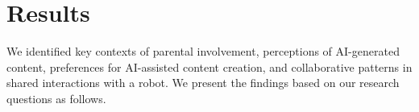 \section{Results}
We identified key contexts of parental involvement, perceptions of AI-generated content, preferences for AI-assisted content creation, and collaborative patterns in shared interactions with a robot. We present the findings based on our research questions as follows.





